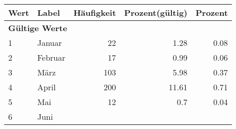      \begin{longtable}{lXrrr}
     \toprule
     \textbf{Wert} & \textbf{Label} & \textbf{Häufigkeit} & \textbf{Prozent(gültig)} & \textbf{Prozent} \\
     \endhead
     \midrule
     \multicolumn{5}{l}{\textbf{Gültige Werte}}\\

     1 &
     \multicolumn{1}{X}{ Januar   } &


       \num{22} &
       \num[round-mode=places,round-precision=2]{1.28} &
         \num[round-mode=places,round-precision=2]{0.08} \\

     2 &
     \multicolumn{1}{X}{ Februar   } &


       \num{17} &
       \num[round-mode=places,round-precision=2]{0.99} &
         \num[round-mode=places,round-precision=2]{0.06} \\

     3 &
     \multicolumn{1}{X}{ März   } &


       \num{103} &
       \num[round-mode=places,round-precision=2]{5.98} &
         \num[round-mode=places,round-precision=2]{0.37} \\

     4 &
     \multicolumn{1}{X}{ April   } &


       \num{200} &
       \num[round-mode=places,round-precision=2]{11.61} &
         \num[round-mode=places,round-precision=2]{0.71} \\

     5 &
     \multicolumn{1}{X}{ Mai   } &


       \num{12} &
       \num[round-mode=places,round-precision=2]{0.7} &
         \num[round-mode=places,round-precision=2]{0.04} \\

     6 &
     \multicolumn{1}{X}{ Juni   } &



\end{longtable}
